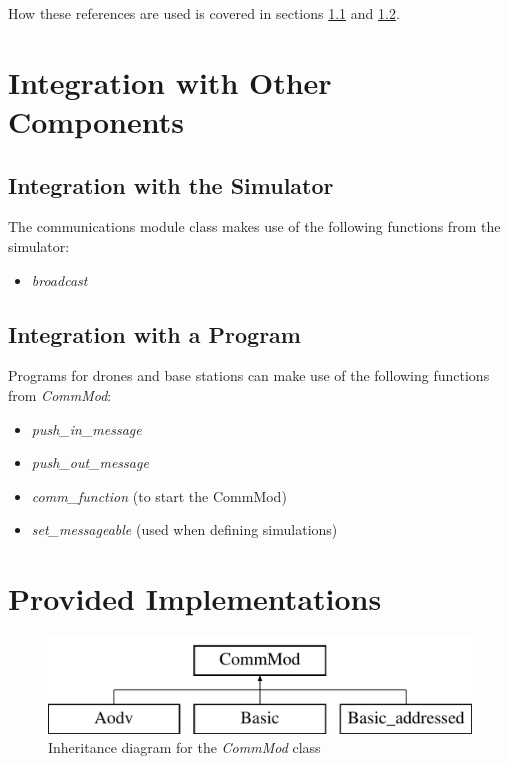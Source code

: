How these references are used is covered in sections \ref{int-sim} and \ref{int-pro}.

\section{Integration with Other Components}

\subsection{Integration with the Simulator}
\label{int-sim}
The communications module class makes use of the following functions from the simulator:

\begin{itemize}
\item \textit{broadcast}
\end{itemize}

\subsection{Integration with a Program}
\label{int-pro}
Programs for drones and base stations can make use of the following functions from \textit{CommMod}:

\begin{itemize}
\item \textit{push\_in\_message}
\item \textit{push\_out\_message}
\item \textit{comm\_function} (to start the CommMod)
\item \textit{set\_messageable} (used when defining simulations)
\end{itemize}

\section{Provided Implementations}
\begin{figure}
\centering
\includegraphics[scale=0.4]{../documentation/latex/class_comm_mod}	
\caption{Inheritance diagram for the \textit{CommMod} class}
\end{figure}

